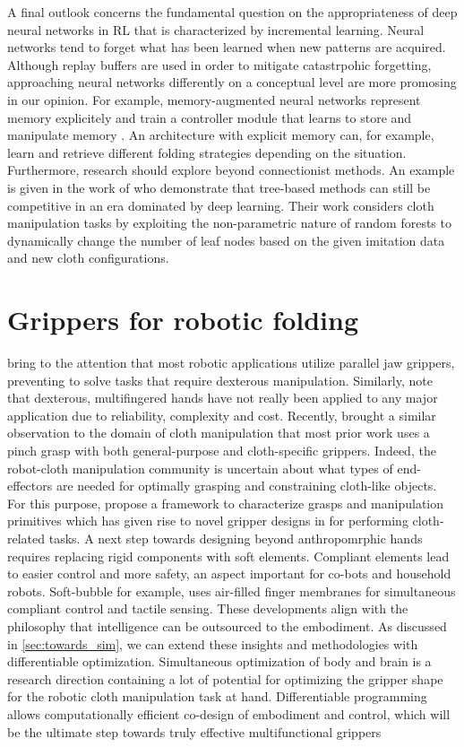 \documentclass[\home/main.tex]{subfiles}
\begin{document}
A final outlook concerns the fundamental question on the appropriateness of deep neural networks in \gls{RL} that is characterized by incremental learning. Neural networks tend to forget what has been learned when new patterns are acquired. Although replay buffers are used in order to mitigate catastrpohic forgetting, approaching neural networks differently on a conceptual level are more promosing in our opinion. For example, memory-augmented neural networks represent memory explicitely and train a controller module that learns to store and manipulate memory \autocite{graves2014neural}. An architecture with explicit memory can, for example, learn and retrieve different folding strategies depending on the situation. Furthermore, research should explore beyond connectionist methods. An example is given in the work of \textcite{Jia2019} who demonstrate that tree-based methods can still be competitive in an era dominated by deep learning. Their work considers cloth manipulation tasks by exploiting the non-parametric nature of random forests to dynamically change the number of leaf nodes based on the given imitation data and new cloth configurations.

\section{Grippers for robotic folding}
\Textcite{Billard2019} bring to the attention that most robotic applications utilize parallel jaw grippers, preventing to solve tasks that require dexterous manipulation. Similarly, \textcite{Siciliano2008} note that dexterous, multifingered hands have not really been applied to any major application due to reliability, complexity and cost. Recently, \textcite{Borras2020} brought a similar observation to the domain of cloth manipulation that most prior work uses a pinch grasp with both general-purpose and cloth-specific grippers. Indeed, the robot-cloth manipulation community is uncertain about what types of end-effectors are needed for optimally grasping and constraining cloth-like objects. For this purpose, \citeauthor{Borras2020} propose a framework to characterize grasps and manipulation primitives which has given rise to novel gripper designs in \autocite{Donaire2020} for performing cloth-related tasks. 
A next step towards designing beyond anthropomrphic hands requires replacing rigid components with soft elements. Compliant elements lead to easier control and more safety, an aspect important for co-bots and household robots. Soft-bubble \autocite{Naveen2020soft} for example, uses air-filled finger membranes for simultaneous compliant control and tactile sensing.
These developments align with the philosophy that intelligence can be outsourced to the embodiment.
As discussed in \cref{sec:towards_sim}, we can extend these insights and methodologies with differentiable optimization. Simultaneous optimization of body and brain is a research direction containing a lot of potential for optimizing the gripper shape for the robotic cloth manipulation task at hand. Differentiable programming allows computationally efficient co-design of embodiment and control, which will be the ultimate step towards truly effective multifunctional grippers
\end{document}
